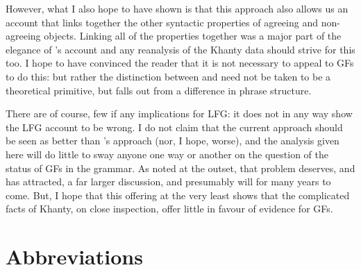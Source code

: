 \documentclass[output=paper
,modfonts
,nonflat]{langsci/langscibook}
\begin{document}
However, what I also hope to have shown is that this approach also allows us an account that links together the other syntactic properties of agreeing and non-agreeing objects.
Linking all of the properties together was a major part of the elegance of \citeauthor{dn2011}'s account and any reanalysis of the Khanty data should strive for this too.
I hope to have convinced the reader that it is not necessary to appeal to GFs to do this: but rather the distinction between \object{} and \robj{} need not be taken to be a theoretical primitive, but falls out from a difference in phrase structure.

There are of course, few if any implications for LFG: it does not in any way show the LFG account to be wrong. 
I do not claim that the current approach should be seen as better than \citeauthor{dn2011}'s approach (nor, I hope, worse), and the analysis given here will do little to sway anyone one way or another on the question of the status of GFs in the grammar.
As noted at the outset, that problem deserves, and has attracted, a far larger discussion, and presumably will for many years to come.
But, I hope that this offering at the very least shows that the complicated facts of Khanty, on close inspection, offer little in favour of evidence for GFs.

\section*{Abbreviations}
\end{document}
